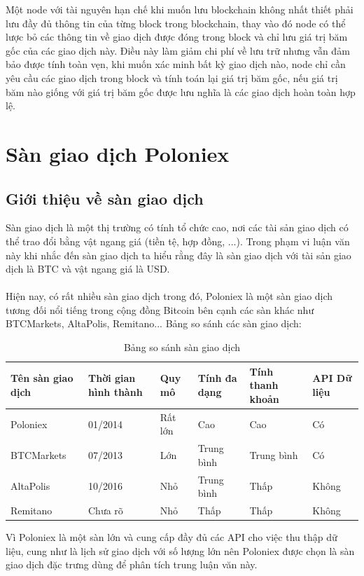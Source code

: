 Một node với tài nguyên hạn chế khi muốn lưu blockchain không nhất thiết phải 
lưu đầy đủ thông tin của từng block trong blockchain, thay vào đó node có thể 
lược bỏ các thông tin về giao dịch được đóng trong block và chỉ lưu giá trị băm 
gốc của các giao dịch này. Điều này làm giảm chi phí về lưu trữ nhưng vẫn đảm 
bảo được tính toàn vẹn, khi muốn xác minh bất kỳ giao dịch nào, node chỉ cần 
yêu cầu các giao dịch trong block và tính toán lại giá trị băm gốc, nếu giá trị 
băm nào giống với giá trị băm gốc được lưu nghĩa là các giao dịch hoàn toàn hợp 
lệ.
\section{Sàn giao dịch Poloniex}
\subsection{Giới thiệu về sàn giao dịch}
Sàn giao dịch là một thị trường có tính tổ chức cao, nơi các tài sản giao dịch 
có thể trao đổi bằng vật ngang giá (tiền tệ, hợp đồng, ...). Trong phạm vi luận 
văn này khi nhắc đến sàn giao dịch ta hiểu rằng đây là sàn giao dịch với tài 
sản giao dịch là BTC và vật ngang giá là USD.\\\\
Hiện nay, có rất nhiều sàn giao dịch trong đó, Poloniex là một sàn giao dịch 
tương đối nổi tiếng trong cộng đồng Bitcoin bên cạnh các sàn khác như BTCMarkets, 
AltaPolis, Remitano...
Bảng so sánh các sàn giao dịch:
\begin{table}[h]
\centering
\begin{tabularx}{\textwidth}{ |l|X|X|X|X|X| }
\hline
Tên sàn giao dịch & Thời gian hình thành & Quy mô & Tính đa dạng & Tính thanh khoản & API Dữ liệu \\
\hline
Poloniex & 01/2014 & Rất lớn & Cao & Cao & Có \\
\hline 
BTCMarkets & 07/2013 & Lớn & Trung bình & Trung bình & Có \\
\hline
AltaPolis & 10/2016 & Nhỏ & Trung bình & Thấp & Không \\
\hline
Remitano & Chưa rõ & Nhỏ & Thấp & Thấp & Không \\
\hline
\end{tabularx}
\caption{Bảng so sánh sàn giao dịch}
\end{table}
Vì Poloniex là một sàn lớn và cung cấp đầy đủ các API cho việc thu thập dữ liệu, 
cung như là lịch sử giao dịch với số lượng lớn nên Poloniex được chọn là sàn 
giao dịch đặc trưng dùng để phân tích trung luận văn này.
